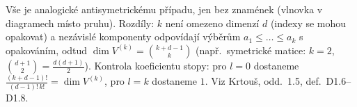 \begin{vysvetleni}
Vše je analogické antisymetrickému případu, jen bez znamének (vlnovka v diagramech místo pruhu). Rozdíly: $k$ není omezeno dimenzí $d$ (indexy se mohou opakovat) a nezávislé komponenty odpovídají výběrům $a_1\le\dots\le a_k$ s opakováním, odtud $\dim V^{(k)}=\binom{k+d-1}{k}$ (např.\ symetrické matice: $k=2$, $\binom{d+1}2=\frac{d(d+1)}2$).
Kontrola koeficientu stopy: pro $l=0$ dostaneme $\frac{(k+d-1)!}{(d-1)!\,k!}=\dim V^{(k)}$, pro $l=k$ dostaneme $1$. Viz Krtouš, odd.~1.5, def.~D1.6--D1.8.
\end{vysvetleni}

